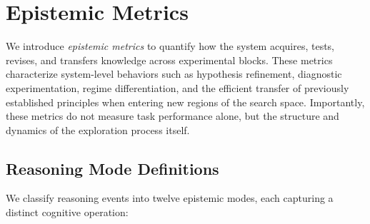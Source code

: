 \documentclass[10pt,twocolumn]{article}
\begin{document}
\appendix
\section{Epistemic Metrics}
\label{appendix:epistemic_metrics}

We introduce \emph{epistemic metrics} to quantify how the system acquires, tests, revises, and transfers knowledge across experimental blocks. These metrics characterize system-level behaviors such as hypothesis refinement, diagnostic experimentation, regime differentiation, and the efficient transfer of previously established principles when entering new regions of the search space. Importantly, these metrics do not measure task performance alone, but the structure and dynamics of the exploration process itself.

\subsection{Reasoning Mode Definitions}

We classify reasoning events into twelve epistemic modes, each capturing a distinct cognitive operation:
\end{document}
